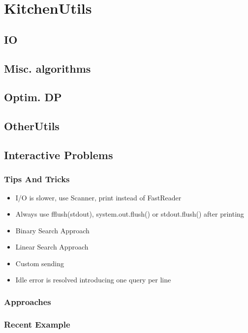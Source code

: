 \chapter{KitchenUtils}

\section{IO}

\section{Misc. algorithms}

 \section{Optim. DP}

  \section{OtherUtils}

  \section{Interactive Problems}
  	\subsection{Tips And Tricks}
		\begin{itemize}
			\item I/O is slower, use Scanner, print instead of FastReader
			\item Always use fflush(stdout), system.out.flush() or stdout.flush() after printing
			\item Binary Search Approach
			\item Linear Search Approach
			\item Custom sending
			\item Idle error is resolved introducing one query per line
		\end{itemize}
  	\subsection{Approaches}
	\subsection{Recent Example}
